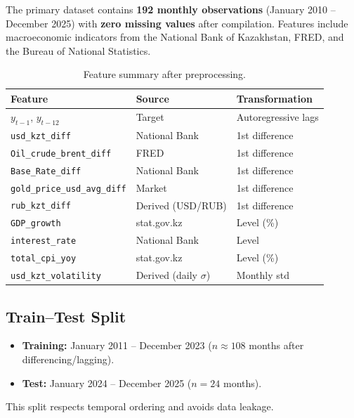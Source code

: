 \documentclass[12pt,a4paper]{article}
\begin{document}
The primary dataset contains \textbf{192 monthly observations}
(January 2010 -- December 2025) with \textbf{zero missing values} after
compilation. Features include macroeconomic indicators from the National
Bank of Kazakhstan, FRED, and the Bureau of National Statistics.

\begin{table}[H]
\centering
\caption{Feature summary after preprocessing.}
\label{tab:features}
\begin{tabular}{@{}lll@{}}
\toprule
\textbf{Feature} & \textbf{Source} & \textbf{Transformation} \\
\midrule
$y_{t-1}$, $y_{t-12}$      & Target            & Autoregressive lags \\
\texttt{usd\_kzt\_diff}     & National Bank      & 1st difference \\
\texttt{Oil\_crude\_brent\_diff} & FRED          & 1st difference \\
\texttt{Base\_Rate\_diff}   & National Bank      & 1st difference \\
\texttt{gold\_price\_usd\_avg\_diff} & Market    & 1st difference \\
\texttt{rub\_kzt\_diff}     & Derived (USD/RUB)  & 1st difference \\
\texttt{GDP\_growth}        & stat.gov.kz        & Level (\%) \\
\texttt{interest\_rate}     & National Bank      & Level \\
\texttt{total\_cpi\_yoy}    & stat.gov.kz        & Level (\%) \\
\texttt{usd\_kzt\_volatility} & Derived (daily $\sigma$) & Monthly std \\
\bottomrule
\end{tabular}
\end{table}

\subsection{Train--Test Split}

\begin{itemize}[nosep]
    \item \textbf{Training:} January 2011 -- December 2023 ($n \approx 108$ months after differencing/lagging).
    \item \textbf{Test:} January 2024 -- December 2025 ($n = 24$ months).
\end{itemize}

This split respects temporal ordering and avoids data leakage.
\end{document}
